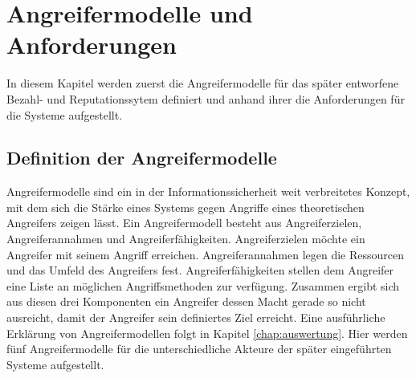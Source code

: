 \documentclass[
	fontsize=11pt,
	headings=small,
	parskip=half,           %
	bibliography=totoc,
	numbers=noenddot,       %
	open=any,               %
]{scrreprt}
\begin{document}
\chapter{Angreifermodelle und Anforderungen}
In diesem Kapitel werden zuerst die Angreifermodelle für das später entworfene Bezahl- und Reputationssytem definiert und anhand ihrer die Anforderungen für die Systeme aufgestellt.
\label{chap:req}
\section{Definition der Angreifermodelle}
Angreifermodelle sind ein in der Informationssicherheit weit verbreitetes Konzept, mit dem sich die Stärke eines Systems gegen Angriffe eines theoretischen Angreifers zeigen lässt. Ein Angreifermodell besteht aus Angreiferzielen, Angreiferannahmen und Angreiferfähigkeiten. Angreiferzielen möchte ein Angreifer mit seinem Angriff erreichen. Angreiferannahmen legen die Ressourcen und das Umfeld des Angreifers fest. Angreiferfähigkeiten stellen dem Angreifer eine Liste an möglichen Angriffsmethoden zur verfügung. Zusammen ergibt sich aus diesen drei Komponenten ein Angreifer dessen Macht gerade so nicht ausreicht, damit der Angreifer sein definiertes Ziel erreicht. Eine ausführliche Erklärung von Angreifermodellen folgt in Kapitel \ref{chap:auswertung}. Hier werden fünf Angreifermodelle für die unterschiedliche Akteure der später eingeführten Systeme aufgestellt.\\
\end{document}
